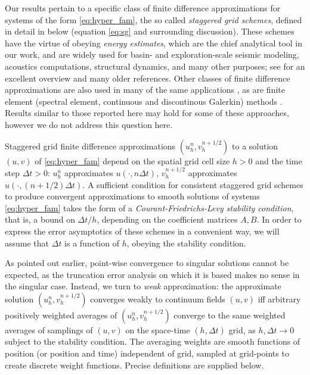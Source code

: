 Our results pertain to a specific class of finite difference
approximations for systems of the form \ref{eq:hyper_fam},
the so called {\em staggered grid schemes}, defined in detail in below
(equation \ref{eq:sg} and surrounding discussion). These schemes have the
virtue of obeying {\em energy estimates}, which are the chief
analytical tool in our work, and are widely used for basin-
and exploration-scale seismic modeling, acoustics computations,
structural dynamics, and many other purposes; see \cite{moczoetal:06} for an
excellent overview and many older references. Other classes of finite
difference approximations are also used in many of the same applications
\cite[]{Cohen:01,moczoetal:06,Petersson:2010,Petersson:2016}, as are finite element 
(spectral element, continuous and discontinous Galerkin) methods 
\cite[]{KomTromp:00,Cohen:01,Ghattas:IP25}. Results similar to those
reported here may hold for some of these approaches, however we do not
address this question here.

Staggered grid finite difference approximations $(u^n_h,v^{n+1/2}_h)$
to a solution  $(u,v)$ of
\ref{eq:hyper_fam} depend on the spatial grid cell size $h>0$ and the
time step $\Delta t>0$: $u^n_h$ approximates $u(\cdot,n\Delta t)$,
$v^{n+1/2}_h$ approximates $u(\cdot,(n+1/2)\Delta t)$. A sufficient
condition for consistent staggered grid schemes to produce convergent
approximations to 
smooth solutions of systems \ref{eq:hyper_fam} takes
the form of a {\em Courant-Friedrichs-Levy stability condition}, that is, a bound on
$\Delta t/h$, depending on the coefficient matrices $A,B$. In order to
express the error asymptotics of these schemes in a convenient way, we
will assume that $\Delta t$ is a function of $h$, obeying the
stability condition. 

As pointed out earlier, point-wise convergence to singular solutions
cannot be expected, as the truncation error analysis on which it is
based makes no sense in the singular case. Instead, we turn to {\em
  weak} approximation: the approximate
solution $(u^n_h,v^{n+1/2}_h)$ converges weakly to continuum fields $(u,v)$ iff
arbitrary positively weighted averages of $(u^n_h,v^{n+1/2}_h)$
converge to the same weighted averages of
samplings of $(u,v)$ on the space-time $(h,\Delta t)$ grid, as $h,
\Delta t \rightarrow 0$ subject to the stability condition. 
The averaging weights are smooth functions of position (or position and time)
independent of grid, sampled at grid-points to create discrete weight functions.
Precise definitions are supplied below. 

